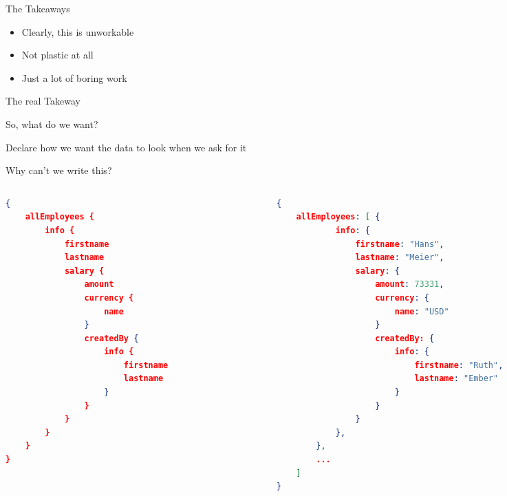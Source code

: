 \documentclass[aspectratio=169,notes]{beamer}
\begin{document}
	\begin{frame}[fragile]{The Takeaways}
		\Large
		\begin{itemize}
			\item Clearly, this is unworkable
			\item Not plastic at all
			\item Just a lot of boring work
		\end{itemize}
	\end{frame}

	\begin{frame}{The real Takeway}
		\begin{center}
		\end{center}
	\end{frame}

	\begin{frame}{So, what do we want?}
		\begin{center}
			\Large
			Declare how we want the data to look when we ask for it
		\end{center}
	\end{frame}

	\begin{frame}[fragile]{Why can't we write this?}
		\vspace{-7mm}	
		\begin{columns}[t]
			\begin{column}{0.5\textwidth}
				\begin{lstlisting}[language=json,basicstyle=\scriptsize\ttfamily]
{
	allEmployees {
		info {
			firstname
			lastname
			salary {
				amount
				currency {
					name
				}
				createdBy {
					info {
						firstname
						lastname
					}
				}
			}
		}
	}
}
\end{lstlisting}	
			\end{column}\pause
			\begin{column}{0.5\textwidth}
				\begin{lstlisting}[language=json,basicstyle=\scriptsize\ttfamily]
{
	allEmployees: [ { 
			info: {
				firstname: "Hans",
				lastname: "Meier",
				salary: {
					amount: 73331,
					currency: {
						name: "USD"
					}
					createdBy: {
						info: {
							firstname: "Ruth",
							lastname: "Ember"
						}
					}
				}
			},
		},
		...
	]
}
\end{lstlisting}	
			\end{column}
			
		\end{columns}
	\end{frame}
\end{document}
